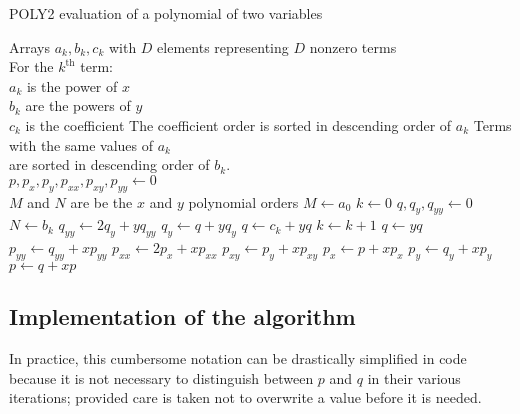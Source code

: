 \documentclass[letterpaper,11pt]{article}
\begin{document}
\begin{algorithm}
\caption{POLY2 evaluation of a polynomial of two variables}\label{alg:poly2}
\begin{algorithmic}
\REQUIRE Arrays $a_k,b_k,c_k$ with $D$ elements representing $D$ nonzero terms\\
For the $k^\mathrm{th}$ term:\\
$a_k$ is the power of $x$\\
$b_k$ are the powers of $y$\\
$c_k$ is the coefficient
\REQUIRE The coefficient order is sorted in descending order of $a_k$
\REQUIRE Terms with the same values of $a_k$\\
are sorted in descending order of $b_k$.\\
\STATE $p, p_x, p_y, p_{xx}, p_{xy}, p_{yy} \leftarrow 0$\\
$M$ and $N$ are be the $x$ and $y$ polynomial orders
\STATE $M \leftarrow a_0$
\STATE $k \leftarrow 0$
\STATE {}
    \STATE $q,q_y,q_{yy} \leftarrow 0$
    \STATE {}
        \STATE $N \leftarrow b_k$
            \STATE $q_{yy} \leftarrow 2 q_y + y q_{yy}$
            \STATE $q_y \leftarrow q + y q_y$
            \STATE {}
                \STATE $q \leftarrow c_k + y q$
                \STATE $k \leftarrow k+1$
            \ELSE
                \STATE $q \leftarrow y q$
            \ENDIF
        \ENDFOR
    \ENDIF
    \STATE $p_{yy} \leftarrow q_{yy} + x p_{yy}$
    \STATE $p_{xx} \leftarrow 2 p_x + x p_{xx}$
    \STATE $p_{xy} \leftarrow p_y + x p_{xy}$
    \STATE $p_x \leftarrow p + x p_x$
    \STATE $p_y \leftarrow q_y + x p_y$
    \STATE $p \leftarrow q + x p$
\ENDFOR
\end{algorithmic}
\end{algorithm}


\subsection{Implementation of the algorithm}
In practice, this cumbersome notation can be drastically simplified in code because it is not necessary to distinguish between $p$ and $q$ in their various iterations; provided care is taken not to overwrite a value before it is needed.
\end{document}
